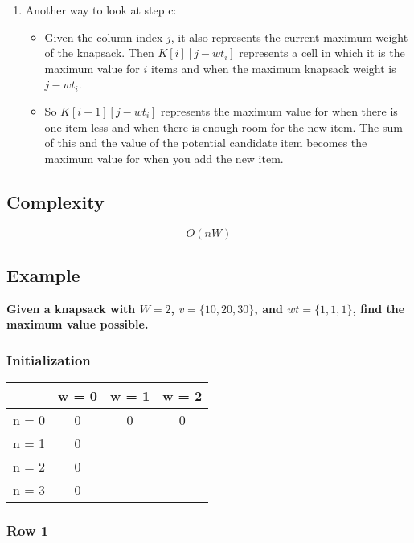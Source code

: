 \begin{enumerate}
\begin{enumerate}
\begin{itemize}
		\end{itemize}
		\item Another way to look at step c:
		\begin{itemize}
			\item Given the column index $j$, it also represents the current maximum weight of the knapsack. Then $K[i][j- wt_i]$ represents a cell in which it is the maximum value for $i$ items and when the maximum knapsack weight is $j - wt_i$.
			\item So $K[i-1][j - wt_i]$ represents the maximum value for when there is one item less and when there is enough room for the new item. The sum of this and the value of the potential candidate item becomes the maximum value for when you add the new item.
		\end{itemize}
	\end{enumerate}
 \end{enumerate}

\subsection*{Complexity}
$$
O(nW)
$$

\subsection{Example}
\textbf{Given a knapsack with $W = 2$, $v = \{ 10, 20, 30 \}$, and $wt = \{ 1, 1, 1 \}$, find the maximum value possible.}

\subsubsection*{Initialization}

\begin{table}[H]
	\centering
	\begin{tabular}{| c | c | c | c |}
		\hline
				&	w = 0	&	w = 1	&	w = 2\\
		\hline
		n = 0	&	0		&	0	&	0\\
		\hline
		n = 1	&	0		&		&	\\
		\hline
		n = 2	&	0		&		&	\\
		\hline
		n = 3	&	0		&		&	\\
		\hline
	\end{tabular}
\end{table}

\subsubsection*{Row 1}

